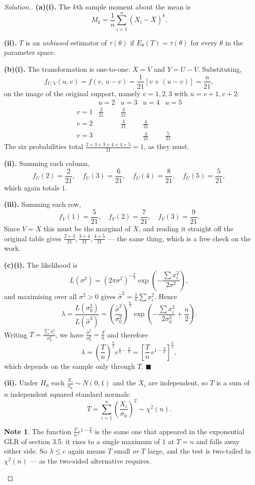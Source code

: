 \documentclass[12pt,a4paper]{report}
\theoremstyle{definition}
\newtheorem{note}[thm]{Note}
\theoremstyle{plain}
\newenvironment{solution}
  {\renewcommand{\qedsymbol}{}\begin{proof}[\textit{Solution}.]}
  {\end{proof}}
\begin{document}
\begin{solution}
\textbf{(a)(i).} The $k$th sample moment about the mean is
\[M_k=\frac{1}{n}\sum_{i=1}^n\left(X_i-\bar X\right)^k.\]

\textbf{(ii).} $T$ is an \emph{unbiased} estimator of $\tau(\theta)$ if
$E_\theta(T)=\tau(\theta)$ for every $\theta$ in the parameter space.

\textbf{(b)(i).} The transformation is one-to-one: $X=V$ and $Y=U-V$. Substituting,
\[f_{U,V}(u,v)=f\left(v,\,u-v\right)=\frac{1}{21}\left[v+(u-v)\right]
=\frac{u}{21},\]
on the image of the original support, namely $v=1,2,3$ with $u=v+1,v+2$:
\[\begin{array}{c|cccc}
 & u=2 & u=3 & u=4 & u=5\\\hline
v=1 & \frac{2}{21} & \frac{3}{21} & & \\
v=2 & & \frac{3}{21} & \frac{4}{21} & \\
v=3 & & & \frac{4}{21} & \frac{5}{21}
\end{array}\]
The six probabilities total $\frac{2+3+3+4+4+5}{21}=1$, as they must.

\textbf{(ii).} Summing each column,
\[f_U(2)=\frac{2}{21},\quad f_U(3)=\frac{6}{21},\quad
f_U(4)=\frac{8}{21},\quad f_U(5)=\frac{5}{21},\]
which again totals $1$.

\textbf{(iii).} Summing each row,
\[f_V(1)=\frac{5}{21},\quad f_V(2)=\frac{7}{21},\quad f_V(3)=\frac{9}{21}.\]
Since $V=X$ this must be the marginal of $X$, and reading it straight off the
original table gives $\frac{2+3}{21},\frac{3+4}{21},\frac{4+5}{21}$ --- the same
thing, which is a free check on the work.

\textbf{(c)(i).} The likelihood is
\[L\left(\sigma^2\right)=\left(2\pi\sigma^2\right)^{-\frac{n}{2}}
\exp\left(-\frac{\sum x_i^2}{2\sigma^2}\right),\]
and maximising over all $\sigma^2>0$ gives
$\hat\sigma^2=\frac{1}{n}\sum x_i^2$. Hence
\[\lambda=\frac{L\left(\sigma_0^2\right)}{L\left(\hat\sigma^2\right)}
=\left(\frac{\hat\sigma^2}{\sigma_0^2}\right)^{\frac{n}{2}}
\exp\left(-\frac{\sum x_i^2}{2\sigma_0^2}+\frac{n}{2}\right).\]
Writing $T=\frac{\sum x_i^2}{\sigma_0^2}$, we have
$\frac{\hat\sigma^2}{\sigma_0^2}=\frac{T}{n}$ and therefore
\[\lambda=\left(\frac{T}{n}\right)^{\frac{n}{2}}
e^{\frac{n}{2}-\frac{T}{2}}
=\left[\frac{T}{n}\,e^{1-\frac{T}{n}}\right]^{\frac{n}{2}},\]
which depends on the sample only through $T$. $\blacksquare$

\textbf{(ii).} Under $H_0$ each $\frac{X_i}{\sigma_0}\sim N(0,1)$ and the
$X_i$ are independent, so $T$ is a sum of $n$ independent squared standard
normals:
\[T=\sum_{i=1}^n\left(\frac{X_i}{\sigma_0}\right)^2\sim\chi^2(n).\]

\begin{note}
The function $\frac{T}{n}e^{1-\frac{T}{n}}$ is the same one that appeared in the
exponential GLR of section 3.5: it rises to a single maximum of $1$ at $T=n$ and
falls away either side. So $\lambda\leq c$ again means $T$ small \emph{or} $T$
large, and the test is two-tailed in $\chi^2(n)$ --- as the two-sided alternative
requires.
\end{note}
\end{solution}
\end{document}
